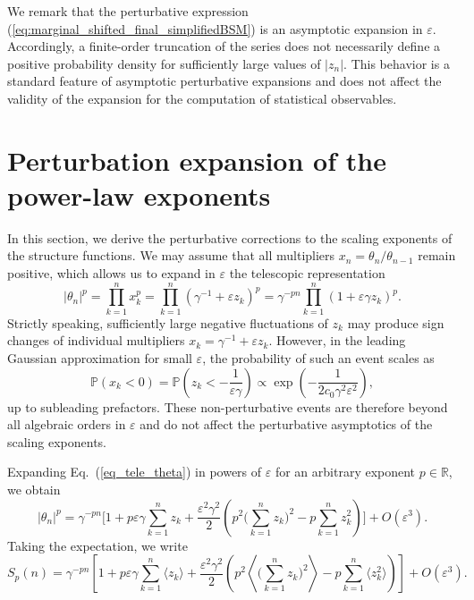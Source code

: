 \documentclass[aps,twocolumn,superscriptaddress]{revtex4-2}
\begin{document}
We remark that the perturbative expression (\ref{eq:marginal_shifted_final_simplifiedBSM}) is an asymptotic expansion in \(\varepsilon\). Accordingly, a finite-order truncation of the series does not necessarily define a positive probability density for sufficiently large values of \(|z_n|\). This behavior is a standard feature of asymptotic perturbative expansions and does not affect the validity of the expansion for the computation of statistical observables.

\section{Perturbation expansion of the power-law exponents}

In this section, we derive the perturbative corrections to the scaling exponents of the structure functions. We may assume that all multipliers \(x_n=\theta_n/\theta_{n-1}\) remain positive, which allows us to expand in \(\varepsilon\) the telescopic representation
\begin{equation}
|\theta_n|^p
= \prod_{k=1}^n x_k^p
= \prod_{k=1}^n (\gamma^{-1}+\varepsilon z_k)^p
= \gamma^{-pn} \prod_{k=1}^n (1+\varepsilon \gamma z_k)^p.
\label{eq_tele_theta}
\end{equation}
Strictly speaking, sufficiently large negative fluctuations of \(z_k\) may produce sign changes of individual multipliers \(x_k=\gamma^{-1}+\varepsilon z_k\). However, in the leading Gaussian approximation for small \(\varepsilon\), the probability of such an event scales as
\begin{equation}
\mathbb{P}(x_k<0)
=
\mathbb{P}\left(z_k<-\frac{1}{\varepsilon\gamma}\right)
\propto
\exp\left(
-\frac{1}{2c_0\gamma^2\varepsilon^2}
\right),
\end{equation}
up to subleading prefactors. These non-perturbative events are therefore beyond all algebraic orders in \(\varepsilon\) and do not affect the perturbative asymptotics of the scaling exponents.

Expanding Eq.~(\ref{eq_tele_theta}) in powers of \(\varepsilon\) for an arbitrary exponent \(p \in \mathbb{R}\), we obtain
\begin{equation}
|\theta_n|^p
=
\gamma^{-pn}
\Bigg[
1
+p\varepsilon \gamma \sum_{k=1}^n z_k
+\frac{\varepsilon^2 \gamma^2}{2}
\left(
p^2 \Big(\sum_{k=1}^n z_k\Big)^2
- p \sum_{k=1}^n z_k^2
\right)
\Bigg]
+O(\varepsilon^3).
\label{eq_prod_tel}
\end{equation}
Taking the expectation, we write
\begin{equation}
S_p(n)
=
\gamma^{-pn}
\left[
1
+p\varepsilon \gamma \sum_{k=1}^n \langle z_k\rangle
+\frac{\varepsilon^2 \gamma^2}{2}
\left(
p^2 \left\langle \Big(\sum_{k=1}^n z_k\Big)^2 \right\rangle
- p \sum_{k=1}^n \langle z_k^2\rangle
\right)
\right]
+O(\varepsilon^3).
\label{eq:Sp_prelim}
\end{equation}
\end{document}
